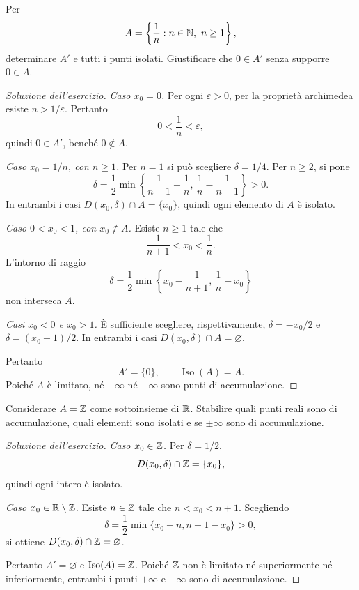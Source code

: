 \begin{exercise}
\label{ex:fondamenti-reciproci-naturali-accumulazione}
Per
\[
  A=\left\{\frac1n:n\in\mathbb{N},\ n\ge1\right\},
\]
determinare $A'$ e tutti i punti isolati.
Giustificare che $0\in A'$ senza supporre $0\in A$.
\end{exercise}
\begin{proof}[Soluzione dell'esercizio]
\emph{Caso $x_0=0$.} Per ogni $\varepsilon>0$, per la
proprietà archimedea esiste $n>1/\varepsilon$. Pertanto
\[
  0<\frac1n<\varepsilon,
\]
quindi $0\in A'$, benché $0\notin A$.

\emph{Caso $x_0=1/n$, con $n\ge1$.} Per $n=1$ si può
scegliere $\delta=1/4$. Per $n\ge2$, si pone
\[
  \delta=\frac12\min\left\{
    \frac1{n-1}-\frac1n,\,
    \frac1n-\frac1{n+1}\right\}>0.
\]
In entrambi i casi $D(x_0,\delta)\cap A=\{x_0\}$,
quindi ogni elemento di $A$ è isolato.

\emph{Caso $0<x_0<1$, con $x_0\notin A$.}
Esiste $n\ge1$ tale che
\[
  \frac1{n+1}<x_0<\frac1n.
\]
L'intorno di raggio
\[
  \delta=\frac12\min\left\{
    x_0-\frac1{n+1},\,\frac1n-x_0\right\}
\]
non interseca $A$.

\emph{Casi $x_0<0$ e $x_0>1$.} È sufficiente scegliere,
rispettivamente, $\delta=-x_0/2$ e $\delta=(x_0-1)/2$.
In entrambi i casi $D(x_0,\delta)\cap A=\varnothing$.

Pertanto
\[
  A'=\{0\},\qquad \operatorname{Iso}(A)=A.
\]
Poiché $A$ è limitato, né $+\infty$ né $-\infty$
sono punti di accumulazione.
\end{proof}

\begin{exercise}
\label{ex:fondamenti-accumulo-numeri-interi}
Considerare $A=\mathbb{Z}$ come sottoinsieme di $\mathbb{R}$.
Stabilire quali punti reali sono di accumulazione,
quali elementi sono isolati e se $\pm\infty$ sono
di accumulazione.
\end{exercise}
\begin{proof}[Soluzione dell'esercizio]
\emph{Caso $x_0\in\mathbb{Z}$.} Per $\delta=1/2$,
\[
  D(x_0,\delta)\cap\mathbb{Z}=\{x_0\},
\]
quindi ogni intero è isolato.

\emph{Caso $x_0\in\mathbb{R}\setminus\mathbb{Z}$.} Esiste $n\in\mathbb{Z}$
tale che $n<x_0<n+1$. Scegliendo
\[
  \delta=\frac12\min\{x_0-n,n+1-x_0\}>0,
\]
si ottiene $D(x_0,\delta)\cap\mathbb{Z}=\varnothing$.

Pertanto $A'=\varnothing$ e $\operatorname{Iso}(A)=\mathbb{Z}$.
Poiché $\mathbb{Z}$ non è limitato né superiormente né
inferiormente, entrambi i punti $+\infty$ e $-\infty$
sono di accumulazione.
\end{proof}

